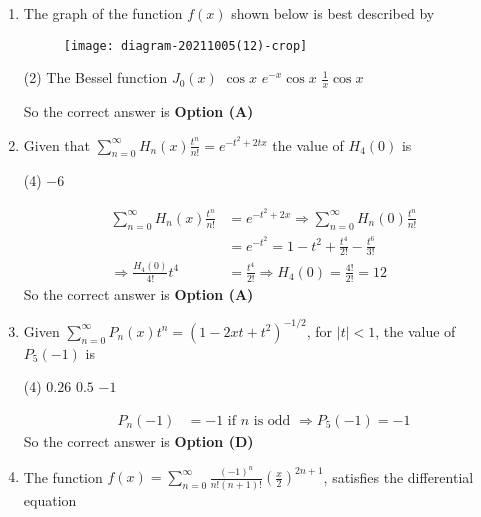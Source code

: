 \begin{enumerate}[label=\color{ocre}\textbf{\arabic*.}]
\begin{answer}
	\end{answer}
	\item  The graph of the function $f(x)$ shown below is best described by
	{}
	\begin{figure}[H]
		\centering
		\texttt{[image: diagram-20211005(12)-crop]}
	\end{figure}
	\begin{tasks}(2)
		\task[\textbf{A.}]  The Bessel function $J_{0}(x)$
		\task[\textbf{B.}] $\cos x$
		\task[\textbf{C.}] $e^{-x} \cos x$
		\task[\textbf{D.}] $\frac{1}{x} \cos x$
	\end{tasks}
	\begin{answer}
		So the correct answer is \textbf{Option (A)}
	\end{answer}
	\item Given that $\sum_{n=0}^{\infty} H_{n}(x) \frac{t^{n}}{n !}=e^{-t^{2}+2 t x}$ the value of $H_{4}(0)$ is
	{}
	\begin{tasks}(4)
		\task[\textbf{D.}] $-6$
	\end{tasks}
	\begin{answer}
		\begin{align*}
		\sum_{n=0}^{\infty} H_{n}(x) \frac{t^{n}}{n !}&=e^{-t^{2}+2 x} \Rightarrow \sum_{n=0}^{\infty} H_{n}(0) \frac{t^{n}}{n !}\\&=e^{-t^{2}}=1-t^{2}+\frac{t^{4}}{2 !}-\frac{t^{6}}{3 !}\\
		\Rightarrow \frac{H_{4}(0)}{4 !} t^{4}&=\frac{t^{4}}{2 !} \Rightarrow H_{4}(0)=\frac{4 !}{2 !}=12
		\end{align*}
		So the correct answer is \textbf{Option (A)}
	\end{answer}
	\item   Given $\sum_{n=0}^{\infty} P_{n}(x) t^{n}=\left(1-2 x t+t^{2}\right)^{-1 / 2}$, for $|t|<1$, the value of $P_{5}(-1)$ is
	{}
	\begin{tasks}(4)
		\task[\textbf{A.}] $0.26$
		\task[\textbf{C.}] $0.5$
		\task[\textbf{D.}] $-1$
	\end{tasks}
	\begin{answer}
		\begin{align*}
		P_{n}(-1)&=-1\text{ if }n\text{ is odd }\Rightarrow P_{5}(-1)=-1
		\end{align*}
		So the correct answer is \textbf{Option (D)}
	\end{answer}
	\item The function $f(x)=\sum_{n=0}^{\infty} \frac{(-1)^{n}}{n !(n+1) !}\left(\frac{x}{2}\right)^{2 n+1}$, satisfies the differential equation

\end{enumerate}
